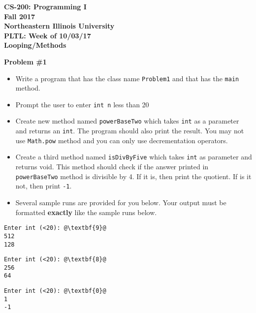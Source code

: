\documentclass[12pt]{article}
\begin{document}
\begin{center}
	\textbf{CS-200: Programming I}\\
	\textbf{Fall 2017}\\
	\textbf{Northeastern Illinois University}\\
	\textbf{PLTL: Week of 10/03/17}\\
	\textbf{Looping/Methods}
\end{center}


\noindent\textbf{Problem \#1}
\begin{itemize}
	\item Write a program that has the class name \texttt{Problem1} and that has the \texttt{main} method.
	\item Prompt the user to enter \texttt{int n} less than 20
	\item Create new method named \texttt{powerBaseTwo} which takes \texttt{int} as a parameter and returns an \texttt{int}. The program should also print the result. You may not use \texttt{Math.pow} method and you can only use decrementation operators.
	\item Create a third method named \texttt{isDivByFive} which takes \texttt{int} as parameter and returns void. This method should check if the answer printed in \texttt{powerBaseTwo} method is divisible by 4. If it is, then print the quotient. If is it not, then print \texttt{-1}.
	\item Several sample runs are provided for you below. Your output must be formatted \textbf{exactly} like the sample runs below. 
\end{itemize}
\begin{center}
\begin{minipage}{4cm}
\begin{lstlisting}[escapechar=@]
Enter int (<20): @\textbf{9}@
512
128
\end{lstlisting}
\end{minipage}
\hspace*{0.5cm}
\begin{minipage}{4cm}
\begin{lstlisting}[escapechar=@]
Enter int (<20): @\textbf{8}@
256
64
\end{lstlisting}
\end{minipage}
\hspace*{0.5cm}
\begin{minipage}{4cm}
\begin{lstlisting}[escapechar=@]
Enter int (<20): @\textbf{0}@
1
-1
\end{lstlisting}
\end{minipage}\\

\end{center}
\end{document}
